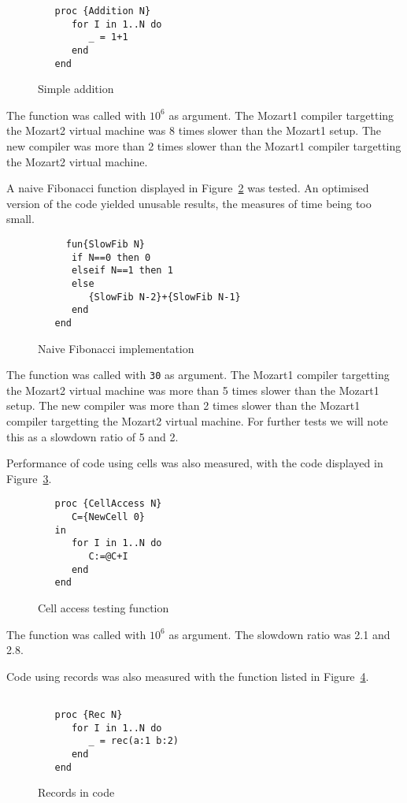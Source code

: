 \documentclass[a4paper]{memoir}
\begin{document}
\begin{figure}[h]
\begin{lstlisting}
   proc {Addition N}
      for I in 1..N do
         _ = 1+1
      end
   end
\end{lstlisting}
\caption{Simple addition}
\label{fig:perf:add}
\end{figure}

The function was called with $10^6$ as argument.
The Mozart1 compiler targetting the Mozart2 virtual machine was 8 times slower
than the Mozart1 setup. The new compiler was more than 2 times slower than the
Mozart1 compiler targetting the Mozart2 virtual machine.




A naive Fibonacci function displayed in
Figure~\ref{fig:perf:fib} was tested. An optimised version of the code yielded unusable results, the measures of time being too small.

\begin{figure}[h]
\begin{lstlisting}
     fun{SlowFib N}
      if N==0 then 0
      elseif N==1 then 1
      else
         {SlowFib N-2}+{SlowFib N-1}
      end
   end
\end{lstlisting}
\caption{Naive Fibonacci implementation}
\label{fig:perf:fib}
\end{figure}

The function was called with \lstinline!30! as argument.
The Mozart1 compiler targetting the Mozart2 virtual machine was more than 5 times slower
than the Mozart1 setup. The new compiler was more than 2 times slower than the
Mozart1 compiler targetting the Mozart2 virtual machine. For further tests we
will note this as a slowdown ratio of 5 and 2.


Performance of code using cells was also measured, with the code displayed in
Figure~\ref{fig:perf:cells}.

\begin{figure}[h]
\begin{lstlisting}
   proc {CellAccess N}
      C={NewCell 0}
   in
      for I in 1..N do
         C:=@C+I
      end
   end
\end{lstlisting}
\caption{Cell access testing function}
\label{fig:perf:cells}
\end{figure}


The function was called with $10^6$ as argument.
The slowdown ratio was 2.1 and 2.8.

Code using records was also measured with the function listed in
Figure~\ref{fig:perf:records}.
\begin{figure}[h]
\begin{lstlisting}
  
   proc {Rec N}
      for I in 1..N do
         _ = rec(a:1 b:2)
      end
   end
\end{lstlisting}
\caption{Records in code}
\label{fig:perf:records}
\end{figure}
\end{document}

